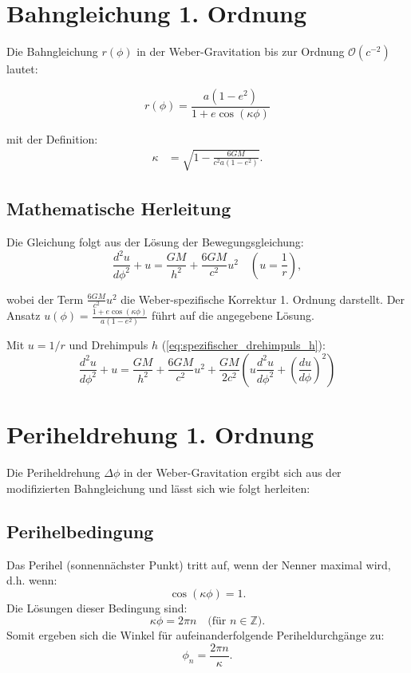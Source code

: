 \newpage
\section{Bahngleichung 1. Ordnung}
Die Bahngleichung \(r(\phi)\) in der Weber-Gravitation bis zur Ordnung \(\mathcal{O}(c^{-2})\) lautet:

\begin{equation}
\label{eq:bahngleichung_1_ordnung}
r(\phi) = \frac{a(1 - e^2)}{1 + e \cos\left(\kappa\phi\right)}
\end{equation}

\noindent mit der Definition:
\begin{align*}
\kappa &= \sqrt{1 - \frac{6GM}{c^2a(1 - e^2)}}.
\end{align*}

\subsection*{Mathematische Herleitung}
Die Gleichung folgt aus der Lösung der Bewegungsgleichung:
\begin{equation}
\frac{d^2u}{d\phi^2} + u = \frac{GM}{h^2} + \frac{6GM}{c^2} u^2 \quad \left(u = \frac{1}{r}\right),
\end{equation}

wobei der Term \(\frac{6GM}{c^2} u^2\) die Weber-spezifische Korrektur 1. Ordnung darstellt. Der Ansatz \(u(\phi) = \frac{1 + e \cos(\kappa\phi)}{a(1 - e^2)}\) führt auf die angegebene Lösung.

Mit $u=1/r$ und Drehimpuls $h$ (\ref{eq:spezifischer_drehimpuls_h}):
\begin{equation}
\frac{d^2u}{d\phi^2} + u = \frac{GM}{h^2} + \frac{6GM}{c^2}u^2 + \frac{GM}{2c^2}\left(u\frac{d^2u}{d\phi^2} + \left(\frac{du}{d\phi}\right)^2\right)
\end{equation}

\section{Periheldrehung 1. Ordnung}
Die Periheldrehung $\Delta\phi$ in der Weber-Gravitation ergibt sich aus der modifizierten Bahngleichung und lässt sich wie folgt herleiten:

\subsection{Perihelbedingung}
Das Perihel (sonnennächster Punkt) tritt auf, wenn der Nenner maximal wird, d.h. wenn:
\begin{equation}
\cos(\kappa\phi) = 1.
\end{equation}
Die Lösungen dieser Bedingung sind:
\begin{equation}
\kappa\phi = 2\pi n \quad \text{(für $n \in \mathbb{Z}$)}.
\end{equation}
Somit ergeben sich die Winkel für aufeinanderfolgende Periheldurchgänge zu:
\begin{equation}
\phi_n = \frac{2\pi n}{\kappa}.
\end{equation}

